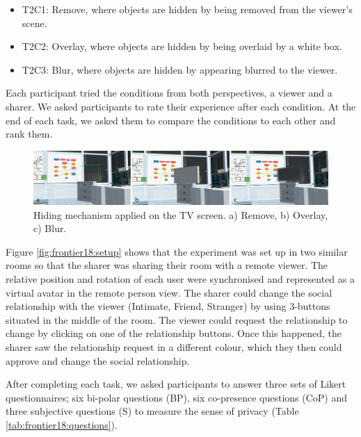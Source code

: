 \begin{itemize}
\item T2C1: Remove, where objects are hidden by being removed from the viewer's scene.
\item T2C2: Overlay, where objects are hidden by being overlaid by a white box. 
\item T2C3: Blur, where objects are hidden by appearing blurred to the viewer. 
\end{itemize}

Each participant tried the conditions from both perspectives, a viewer and a sharer. We asked participants to rate their experience after each condition. At the end of each task, we asked them to compare the conditions to each other and rank them. 

\begin{figure}
\begin{center}
\includegraphics[width=\linewidth]{images/frontier18/images-01.png}
\caption{Hiding mechanism applied on the TV screen. a) Remove, b) Overlay, c) Blur.}\label{fig:frontier18:hiding-mechanism}
\end{center}
\end{figure}

Figure \ref{fig:frontier18:setup} shows that the experiment was set up in two similar rooms so that the sharer was sharing their room with a remote viewer. The relative position and rotation of each user were synchronised and represented as a virtual avatar in the remote person view. The sharer could change the social relationship with the viewer  (Intimate, Friend, Stranger) by using 3-buttons situated in the middle of the room. The viewer could request the relationship to change by clicking on one of the relationship buttons. Once this happened, the sharer saw the relationship request in a different colour, which they then could approve and change the social relationship.

After completing each task, we asked participants to answer three sets of Likert questionnaires; six bi-polar questions (BP), six co-presence questions (CoP) and three subjective questions (S) to measure the sense of privacy (Table \ref{tab:frontier18:questions}).  

